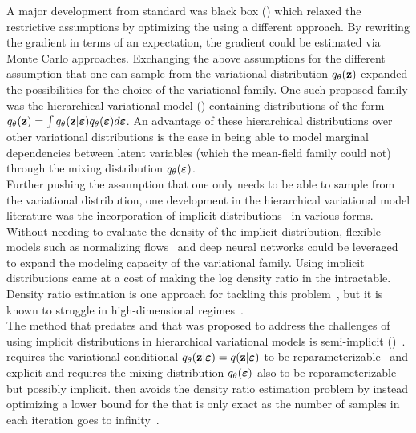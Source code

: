 \documentclass[10pt]{article}
\begin{document}
A major development from standard \vi was black box \vi (\bbvi) \citep{Ranganath:2014} which relaxed the restrictive assumptions by optimizing the \elbo using a different approach. By rewriting the \elbo gradient in terms of an expectation, the gradient could be estimated via Monte Carlo approaches. Exchanging the above assumptions for the different assumption that one can sample from the variational distribution $q_\theta(\mathbf{z})$ expanded the possibilities for the choice of the variational family. One such proposed family was the hierarchical variational model (\hvm) \citep{Ranganath:2016} containing distributions of the form $q_\theta(\mathbf{z}) = \int q_\theta(\mathbf{z}|\bm{\varepsilon})q_\theta(\bm{\varepsilon})d\bm{\varepsilon}$. An advantage of these hierarchical distributions over other variational distributions is the ease in being able to model marginal dependencies between latent variables (which the mean-field family could not) through the mixing distribution $q_\theta(\bm{\varepsilon})$.
\\

Further pushing the assumption that one only needs to be able to sample from the variational distribution, one development in the hierarchical variational model literature was the incorporation of implicit distributions~\citep{Mohamed:2016} in various forms.  Without needing to evaluate the density of the implicit distribution, flexible models such as normalizing flows~\citep{Rezende:2015} and deep neural networks could be leveraged to expand the modeling capacity of the variational family. Using implicit distributions came at a cost of making the log density ratio in the \elbo intractable. Density ratio estimation is one approach for tackling this problem~\citep[e.g.,][]{Mohamed:2016,Huszar:2017}, but it is known to struggle in high-dimensional regimes~\citep{Sugiyama:2012}.
\\

The method that predates \uivi and that was proposed to address the challenges of using implicit distributions in hierarchical variational models is semi-implicit \vi (\sivi)~\citep{Yin:2018}. \sivi requires the variational conditional $q_\theta(\mathbf{z}|\bm{\varepsilon})=q(\mathbf{z}|\bm{\varepsilon})$ to be reparameterizable~\citep{Kingma:2013} and explicit and requires the mixing distribution $q_\theta(\bm{\varepsilon})$ also to be reparameterizable but possibly implicit. \sivi then avoids the density ratio estimation problem by instead optimizing a lower bound for the \elbo that is only exact as the number of samples in each iteration goes to infinity~\citep{Yin:2018,Molchanov:2019}.
\end{document}
